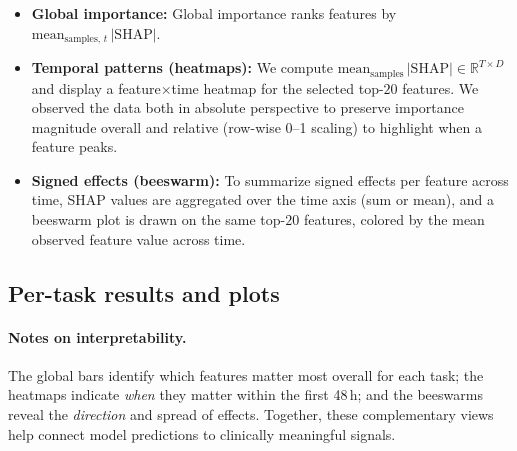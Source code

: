 \documentclass{article}
\theoremstyle{plain}
\theoremstyle{definition}
\theoremstyle{remark}
\begin{document}
\begin{itemize}
    \item \textbf{Global importance:} Global importance ranks features by \(\text{mean}_{\text{samples},\,t}\,|\text{SHAP}|\).  
    \item \textbf{Temporal patterns (heatmaps):} We compute \(\text{mean}_{\text{samples}}\,|\text{SHAP}|\in\mathbb{R}^{T\times D}\) and display a feature\(\times\)time heatmap for the selected top-$20$ features. We observed the data both in absolute perspective to preserve importance magnitude overall and relative (row-wise 0–1 scaling) to highlight when a feature peaks.  
    \item \textbf{Signed effects (beeswarm):} To summarize signed effects per feature across time, SHAP values are aggregated over the time axis (sum or mean), and a beeswarm plot is drawn on the same top-$20$ features, colored by the mean observed feature value across time.  
\end{itemize}


\subsection{Per-task results and plots}

\paragraph{Notes on interpretability.}
The global bars identify which features matter most overall for each task; the heatmaps indicate \emph{when} 
they matter within the first 48\,h; and the beeswarms reveal the \emph{direction} and spread of effects. 
Together, these complementary views help connect model predictions to clinically meaningful signals.


\end{document}
